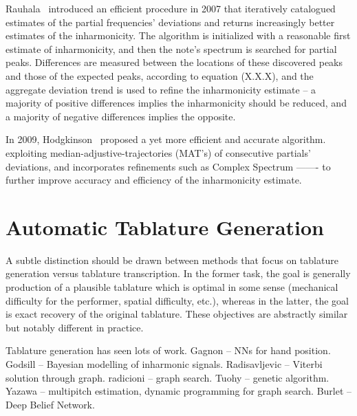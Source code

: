 \documentclass[12pt]{cmuthesis}
\begin{document}
Rauhala~\cite{rauhala} introduced an efficient procedure in 2007 that iteratively catalogued estimates of the partial frequencies' deviations and returns increasingly better estimates of the inharmonicity. The algorithm is initialized with a reasonable first estimate of inharmonicity, and then the note's spectrum is searched for partial peaks. Differences are measured between the locations of these discovered peaks and those of the expected peaks, according to equation (X.X.X), and the aggregate deviation trend is used to refine the inharmonicity estimate -- a majority of positive differences implies the inharmonicity should be reduced, and a majority of negative differences implies the opposite.

In 2009, Hodgkinson~\cite{hodgkinson} proposed a yet more efficient and accurate algorithm. exploiting median-adjustive-trajectories (MAT's) of consecutive partials' deviations, and incorporates refinements such as Complex Spectrum ------- to further improve accuracy and efficiency of the inharmonicity estimate.

\section{Automatic Tablature Generation}
A subtle distinction should be drawn between methods that focus on tablature generation versus tablature transcription. In the former task, the goal is generally production of a plausible tablature which is optimal in some sense (mechanical difficulty for the performer, spatial difficulty, etc.), whereas in the latter, the goal is exact recovery of the original tablature. These objectives are abstractly similar but notably different in practice.

Tablature generation has seen lots of work. Gagnon -- NNs for hand position. Godsill -- Bayesian modelling of inharmonic signals. Radisavljevic -- Viterbi solution through graph. radicioni -- graph search. Tuohy -- genetic algorithm. Yazawa -- multipitch estimation, dynamic programming for graph search. Burlet -- Deep Belief Network.
\end{document}
